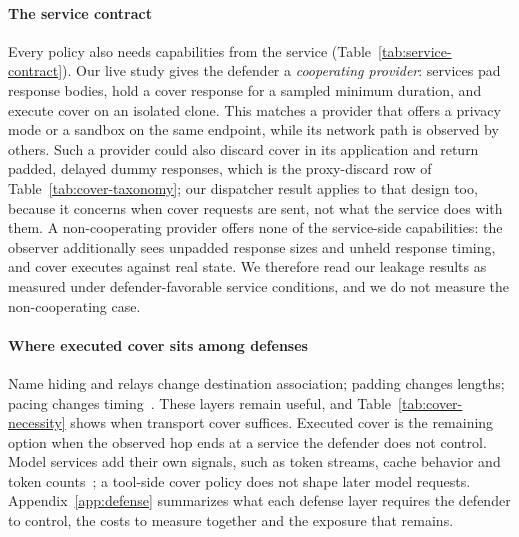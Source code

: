\paragraph{The service contract}
Every policy also needs capabilities from the service (Table~\ref{tab:service-contract}). Our live study gives the defender a \emph{cooperating provider}: services pad response bodies, hold a cover response for a sampled minimum duration, and execute cover on an isolated clone. This matches a provider that offers a privacy mode or a sandbox on the same endpoint, while its network path is observed by others. Such a provider could also discard cover in its application and return padded, delayed dummy responses, which is the proxy-discard row of Table~\ref{tab:cover-taxonomy}; our dispatcher result applies to that design too, because it concerns when cover requests are sent, not what the service does with them. A non-cooperating provider offers none of the service-side capabilities: the observer additionally sees unpadded response sizes and unheld response timing, and cover executes against real state. We therefore read our leakage results as measured under defender-favorable service conditions, and we do not measure the non-cooperating case.



\paragraph{Where executed cover sits among defenses}
Name hiding and relays change destination association; padding changes lengths; pacing changes timing~\cite{wang2017walkietalkie,gong2020front,juarez2016wtfpad}. These layers remain useful, and Table~\ref{tab:cover-necessity} shows when transport cover suffices. Executed cover is the remaining option when the observed hop ends at a service the defender does not control. Model services add their own signals, such as token streams, cache behavior and token counts~\cite{weiss2024prompt,whisperleak2025,earlybird2025,timewilltell2024,carlini2024timing}; a tool-side cover policy does not shape later model requests. Appendix~\ref{app:defense} summarizes what each defense layer requires the defender to control, the costs to measure together and the exposure that remains.

